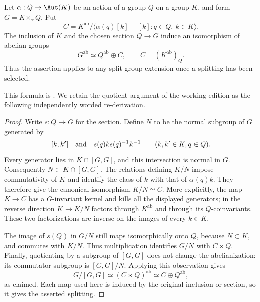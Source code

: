 \begin{lemma}
\label{lem:semidirect-abelianization}
Let $\alpha:Q\to\Aut(K)$ be an action of a group $Q$ on a group $K$,
and form $G=K\rtimes_\alpha Q$. Put
\[
 C=K^{\mathrm{ab}}/
   \langle\alpha(q)[k]-[k]:q\in Q,\ k\in K\rangle.
\]
The inclusion of $K$ and the chosen section $Q\to G$ induce an
isomorphism of abelian groups
\[
 G^{\mathrm{ab}}\simeq Q^{\mathrm{ab}}\oplus C,
 \qquad C=(K^{\mathrm{ab}})_Q.
 \tag{SD.1}\label{eq:semidirect-abelianization}
\]
Thus the assertion applies to any split group extension once a
splitting has been selected.
\end{lemma}
This formula is \citet[Section~10.5, Lemma~10.7, p.~90]{AC2026}.
We retain the quotient argument of the working edition as the following
independently worded re-derivation.
\begin{proof}
Write $s:Q\to G$ for the section. Define $N$ to be the normal subgroup
of $G$ generated by
\[
 [k,k']\quad\hbox{and}\quad s(q)ks(q)^{-1}k^{-1}
 \qquad(k,k'\in K, q\in Q).
\]
Every generator lies in $K\cap[G,G]$, and this intersection is normal
in $G$. Consequently $N\subset K\cap[G,G]$.
The relations defining $K/N$ impose commutativity of $K$ and identify
the class of $k$ with that of $\alpha(q)k$. They therefore give the
canonical isomorphism $K/N\simeq C$. More explicitly, the map $K\to C$
has a $G$-invariant kernel and kills all the displayed generators;
in the reverse direction $K\to K/N$ factors through $K^{\mathrm{ab}}$
and through its $Q$-coinvariants. These two factorizations are inverse
on the images of every $k\in K$.

The image of $s(Q)$ in $G/N$ still maps isomorphically onto $Q$,
because $N\subset K$, and commutes with $K/N$. Thus multiplication
identifies $G/N$ with $C\times Q$. Finally, quotienting by a subgroup
of $[G,G]$ does not change the abelianization: its commutator subgroup
is $[G,G]/N$. Applying this observation gives
\[
 G/[G,G]\simeq (C\times Q)^{\mathrm{ab}}
              \simeq C\oplus Q^{\mathrm{ab}},
\]
as claimed. Each map used here is induced by the original inclusion
or section, so it gives the asserted splitting.
\end{proof}
